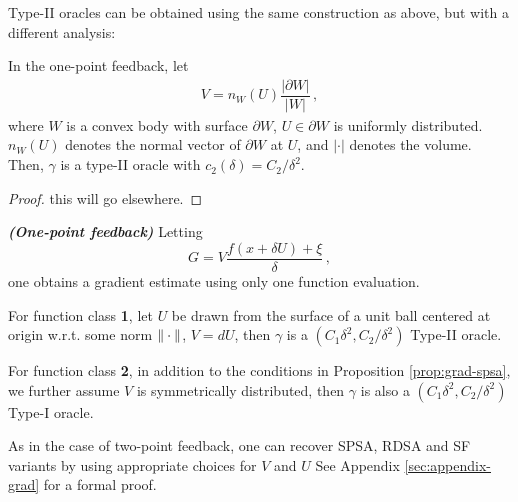 Type-II oracles can be obtained using the same construction as above, but with a different analysis:
\begin{proposition}
\label{prop:flaxman}
In the one-point feedback, let
\begin{align*}
V = n_W(U)\dfrac{\lvert \partial W\rvert}{\lvert W \rvert}\,,
\end{align*}
where $W$ is a convex body with surface $\partial W$, $U \in \partial W$ is uniformly distributed. $n_W(U)$ denotes the normal vector of $\partial W$ at $U$, and $\lvert \cdot \rvert$ denotes the volume. Then, $\gamma$ is a type-II oracle with $c_2(\delta) = C_2/\delta^2$.
\end{proposition}
\begin{proof}
this will go elsewhere.
\end{proof}
\begin{proposition}\textbf{\textit{(One-point feedback)}}
 Letting 
 \[
 G =  V \dfrac{f(x+\delta U) + \xi}{\delta}\,,
 \]
 one obtains a gradient estimate using only one function evaluation.
 
For function class \textbf{1},  let $U$ be drawn from the surface of a unit ball centered at origin w.r.t. some norm $\|\cdot\|$, $V=dU$, then $\gamma$ is a $(C_1\delta^2, C_2/\delta^2)$ Type-II oracle.
 
 For function class \textbf{2}, in addition to the conditions in Proposition \ref{prop:grad-spsa}, we further assume $V$ is symmetrically distributed, then $\gamma$ is also a $(C_1\delta^2, C_2/\delta^2)$ Type-I oracle.
 
\end{proposition}
As in the case of two-point feedback, one can recover SPSA, RDSA and SF variants by using appropriate choices for $V$ and $U$ See Appendix \ref{sec:appendix-grad} for a formal proof.
\fi


